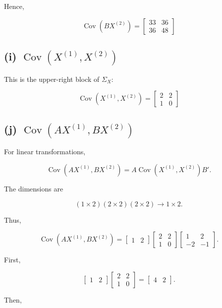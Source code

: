 \documentclass[12pt]{article}
\begin{document}
Hence,

\[
\boxed{
\operatorname{Cov}(BX^{(2)})
=
\begin{bmatrix}
33&36\\
36&48
\end{bmatrix}}
\]

\subsection*{(i) $\operatorname{Cov}(X^{(1)},X^{(2)})$}

This is the upper-right block of $\Sigma_X$:

\[
\boxed{
\operatorname{Cov}(X^{(1)},X^{(2)})
=
\begin{bmatrix}
2&2\\
1&0
\end{bmatrix}}
\]

\subsection*{(j) $\operatorname{Cov}(AX^{(1)},BX^{(2)})$}

For linear transformations,

\[
\operatorname{Cov}(AX^{(1)},BX^{(2)})
=
A\operatorname{Cov}(X^{(1)},X^{(2)})B'.
\]

The dimensions are

\[
(1\times2)(2\times2)(2\times2)
\rightarrow1\times2.
\]

Thus,

\[
\operatorname{Cov}(AX^{(1)},BX^{(2)})
=
\begin{bmatrix}
1&2
\end{bmatrix}
\begin{bmatrix}
2&2\\
1&0
\end{bmatrix}
\begin{bmatrix}
1&2\\
-2&-1
\end{bmatrix}.
\]

First,

\[
\begin{bmatrix}
1&2
\end{bmatrix}
\begin{bmatrix}
2&2\\
1&0
\end{bmatrix}
=
\begin{bmatrix}
4&2
\end{bmatrix}.
\]

Then,
\end{document}
